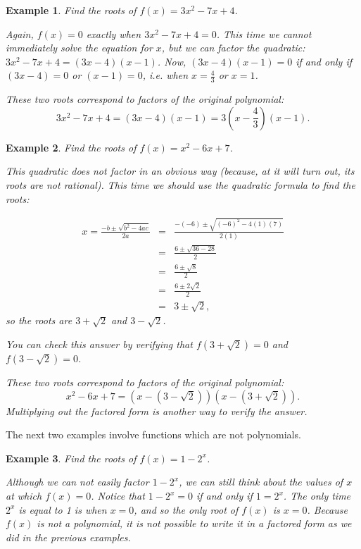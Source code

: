 \documentclass[11pt]{book}               %
\newtheorem{example}{Example}
\begin{document}
\begin{example} Find the roots of $ f(x) = 3x^2 -7x +4 $.

\normalfont 
Again, $f(x)=0$ exactly when $3x^2-7x+4=0$. This time we cannot immediately solve the equation for $x$, but we can factor the quadratic: $3x^2-7x+4 = (3x-4)(x-1)$. Now, $(3x-4)(x-1)=0$ if and only if $(3x-4)=0$ or $(x-1)=0$, i.e. when 
$x =\frac{4}{3}$ or $x=1$.

These two roots correspond to factors of the original polynomial: $$3x^2-7x+4= (3x-4)(x-1)=3\left(x-\frac{4}{3}\right)(x-1).$$ 

\end{example}

\begin{example} Find the roots of $f(x)= x^2-6x+7$.

\normalfont

This quadratic does not factor in an obvious way (because, at it will turn out, its roots are not rational). This time we should use the quadratic formula to find the roots:

    \[
    \begin{array}{rcl}
    x = \frac{-b\pm\sqrt{b^2-4ac}}{2a}  &=& \frac{-(-6)\pm\sqrt{(-6)^2-4(1)(7)}}{2(1)}\\
                                &=& \frac{6\pm\sqrt{36-28}}{2}\\
                                &=& \frac{6\pm\sqrt{8}}{2}\\
                                &=& \frac{6\pm2\sqrt{2}}{2}\\
                                &=& 3\pm \sqrt{2},
    \end{array}
    \]
so the roots are $3+\sqrt{2}$ and $3-\sqrt{2}$. 

You can check this answer by verifying that $f\left(3+\sqrt{2}\right) = 0$ and $f\left(3-\sqrt{2}\right) = 0$.

These two roots correspond to factors of the original polynomial: $$x^2-6x+7 = \left(x-\left(3-\sqrt{2}\right)\right)\left(x-\left(3+\sqrt{2}\right)\right).$$ Multiplying out  the factored form is another way to verify the answer.

\end{example}


The next two examples involve functions which are not polynomials.

\begin{example} Find the roots of $ f(x) = 1-2^x $.

\normalfont

Although we can not easily factor $1-2^x$, we can still think about the values of $x$ at which $f(x)=0$.
Notice that $1-2^x=0$ if and only if $1= 2^x$. The only time $2^x$ is equal to 1 is when $x=0$, and so the only root of $f(x)$ is $x=0$.
Because $f(x)$ is not a polynomial, it is not possible to write it in a factored form as we did in the previous examples.

\end{example}
\end{document}

